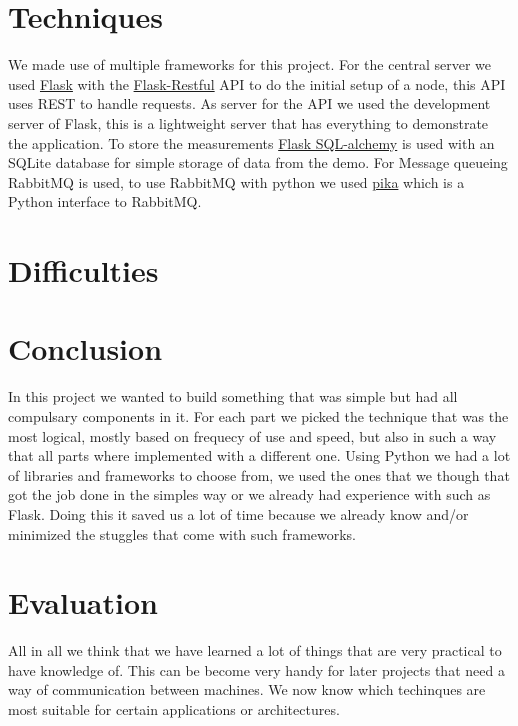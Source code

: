 \documentclass{article}
\begin{document}
\section{Techniques}
    We made use of multiple frameworks for this project. For the central server
    we used \href{http://flask.pocoo.org/}{Flask} with the 
    \href{https://flask-restful.readthedocs.io/en/0.3.5/}{Flask-Restful} API to
    do the initial setup of a node, this API uses REST to handle requests. As
    server for the API we used the development server of Flask, this is a 
    lightweight server that has everything to demonstrate the application. To 
    store the measurements 
    \href{http://flask-sqlalchemy.pocoo.org/2.1/}{Flask SQL-alchemy} is used 
    with an SQLite database for simple storage of data from the demo.
    For Message queueing RabbitMQ is used, to use RabbitMQ with python we 
    used \href{https://github.com/pika/pika}{pika} which is a Python interface
    to RabbitMQ. 

\section{Difficulties}

\section{Conclusion}
    In this project we wanted to build something that was simple but had all
    compulsary components in it. For each part we picked the technique that 
    was the most logical, mostly based on frequecy of use and speed, but also in
    such a way that all parts where implemented with a different one. Using 
    Python we had a lot of libraries and frameworks to choose from, we used 
    the ones that we though that got the job done in the simples way or we 
    already had experience with such as Flask. Doing this it saved us a lot of 
    time because we already know and/or minimized the stuggles that come with 
    such frameworks. 

\section{Evaluation}
    All in all we think that we have learned a lot of things that are very 
    practical to have knowledge of. This can be become very handy for later 
    projects that need a way of communication between machines. We now know 
    which techinques are most suitable for certain applications or architectures.
\end{document}
